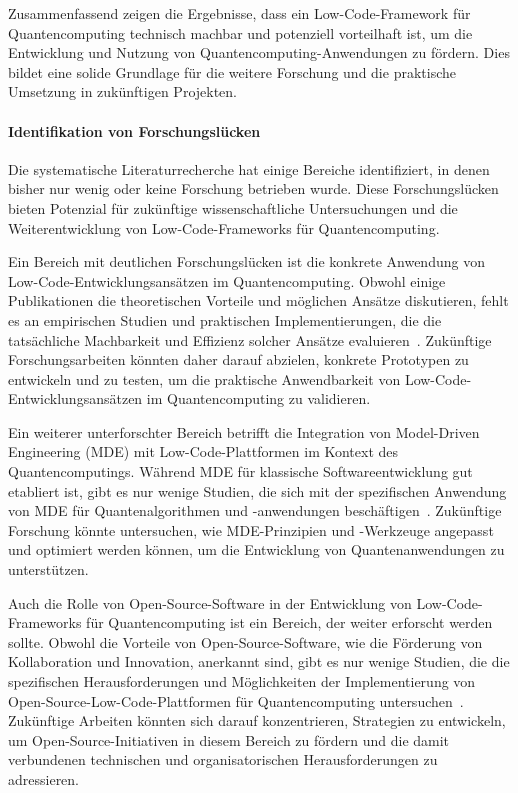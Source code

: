Zusammenfassend zeigen die Ergebnisse, dass ein Low-Code-Framework für Quantencomputing technisch machbar und 
potenziell vorteilhaft ist, um die Entwicklung und Nutzung von Quantencomputing-Anwendungen zu fördern. Dies bildet 
eine solide Grundlage für die weitere Forschung und die praktische Umsetzung in zukünftigen Projekten.

\paragraph{Identifikation von Forschungslücken}

Die systematische Literaturrecherche hat einige Bereiche identifiziert, in denen bisher nur wenig oder keine Forschung 
betrieben wurde. Diese Forschungslücken bieten Potenzial für zukünftige wissenschaftliche Untersuchungen und 
die Weiterentwicklung von Low-Code-Frameworks für Quantencomputing.

Ein Bereich mit deutlichen Forschungslücken ist die konkrete Anwendung von Low-Code-Entwicklungsansätzen im 
Quantencomputing. Obwohl einige Publikationen die theoretischen Vorteile und möglichen Ansätze diskutieren, 
fehlt es an empirischen Studien und praktischen Implementierungen, die die tatsächliche Machbarkeit und Effizienz 
solcher Ansätze evaluieren~\cite{Perez-Delgado_2020, Gemeinhardt_2021}. Zukünftige Forschungsarbeiten könnten daher 
darauf abzielen, konkrete Prototypen zu entwickeln und zu testen, um die praktische Anwendbarkeit von 
Low-Code-Entwicklungsansätzen im Quantencomputing zu validieren.

Ein weiterer unterforschter Bereich betrifft die Integration von Model-Driven Engineering (MDE) mit Low-Code-Plattformen 
im Kontext des Quantencomputings. Während MDE für klassische Softwareentwicklung gut etabliert ist, gibt es nur wenige 
Studien, die sich mit der spezifischen Anwendung von MDE für Quantenalgorithmen und -anwendungen 
beschäftigen~\cite{Gemeinhardt_2023, Perez-Castillo_2022}. Zukünftige Forschung könnte untersuchen, wie MDE-Prinzipien 
und -Werkzeuge angepasst und optimiert werden können, um die Entwicklung von Quantenanwendungen zu unterstützen.

Auch die Rolle von Open-Source-Software in der Entwicklung von Low-Code-Frameworks für Quantencomputing ist ein Bereich, 
der weiter erforscht werden sollte. Obwohl die Vorteile von Open-Source-Software, wie die Förderung von Kollaboration und 
Innovation, anerkannt sind, gibt es nur wenige Studien, die die spezifischen Herausforderungen und Möglichkeiten der 
Implementierung von Open-Source-Low-Code-Plattformen für Quantencomputing untersuchen~\cite{Amato_2023, Ahmad_2023}. 
Zukünftige Arbeiten könnten sich darauf konzentrieren, Strategien zu entwickeln, um Open-Source-Initiativen in diesem 
Bereich zu fördern und die damit verbundenen technischen und organisatorischen Herausforderungen zu adressieren.

